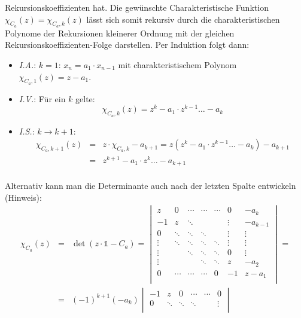 \begin{enumerate}[(a)]
	Rekursionskoeffizienten hat.
	Die gewünschte Charakteristische Funktion $\chi_{C_a}(z) = \chi_{C_a,k}(z)$ lässt sich somit rekursiv durch die
	charakteristischen Polynome der Rekursionen kleinerer Ordnung mit der gleichen Rekursionskoeffizienten-Folge darstellen.
	Per Induktion folgt dann:
	\begin{itemize}
		\item \textit{I.A.}: $k=1$: $x_{n} = a_1 \cdot x_{n-1}$ mit charakteristischem Polynom $\chi_{C_a, 1}(z) = z - a_1$.
		\item \textit{I.V.}: Für ein $k$ gelte:
				\[ \chi_{C_a, k}(z) = z^k - a_1 \cdot z^{k-1} \ldots - a_k \]
		\item \textit{I.S.}: $k \rightarrow k+1$:
				\begin{eqnarray*}
					\chi_{C_a,k+1}(z) &=& z \cdot \chi_{C_a,k} - a_{k+1} = z (z^k - a_1 \cdot z^{k-1} \ldots - a_k) - a_{k+1} \\
					&=& z^{k+1} - a_1 \cdot z^k \ldots - a_{k+1} \\
				\end{eqnarray*}
	\end{itemize}
	Alternativ kann man die Determinante auch nach der letzten Spalte entwickeln (Hinweis):
	\begin{eqnarray*}
	\chi_{C_a}(z) &=& \det ( z\cdot \mathds{1} - C_a) = 
		\begin{vmatrix}
			z      & 0      & \cdots & \cdots & \cdots & 0      & -a_k     \\
			-1     & z      & \ddots &        &        & \vdots & -a_{k-1} \\
			0      & \ddots & \ddots & \ddots &        & \vdots & \vdots   \\
			\vdots & \ddots & \ddots & \ddots & \ddots & \vdots & \vdots   \\
			\vdots &        & \ddots & \ddots & \ddots & 0      & \vdots   \\
			\vdots &        &        & \ddots & \ddots & z      & -a_2     \\
			0      & \cdots & \cdots & \cdots & 0      & -1     & z - a_1  \\
		\end{vmatrix} = \\
	&=& (-1)^{k+1}(-a_k) 	\begin{vmatrix}
					-1     & z      & 0      & \cdots & \cdots & 0      \\
                                        0      & \ddots & \ddots & \ddots &        & \vdots \\

\end{vmatrix}
\end{eqnarray*}
\end{enumerate}
